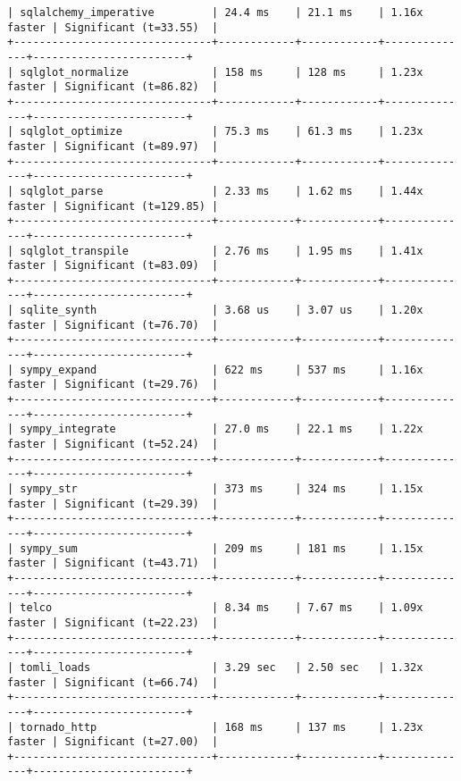 \begin{code}
\begin{verbatim}
| sqlalchemy_imperative         | 24.4 ms    | 21.1 ms    | 1.16x faster | Significant (t=33.55)  |
+-------------------------------+------------+------------+--------------+------------------------+
| sqlglot_normalize             | 158 ms     | 128 ms     | 1.23x faster | Significant (t=86.82)  |
+-------------------------------+------------+------------+--------------+------------------------+
| sqlglot_optimize              | 75.3 ms    | 61.3 ms    | 1.23x faster | Significant (t=89.97)  |
+-------------------------------+------------+------------+--------------+------------------------+
| sqlglot_parse                 | 2.33 ms    | 1.62 ms    | 1.44x faster | Significant (t=129.85) |
+-------------------------------+------------+------------+--------------+------------------------+
| sqlglot_transpile             | 2.76 ms    | 1.95 ms    | 1.41x faster | Significant (t=83.09)  |
+-------------------------------+------------+------------+--------------+------------------------+
| sqlite_synth                  | 3.68 us    | 3.07 us    | 1.20x faster | Significant (t=76.70)  |
+-------------------------------+------------+------------+--------------+------------------------+
| sympy_expand                  | 622 ms     | 537 ms     | 1.16x faster | Significant (t=29.76)  |
+-------------------------------+------------+------------+--------------+------------------------+
| sympy_integrate               | 27.0 ms    | 22.1 ms    | 1.22x faster | Significant (t=52.24)  |
+-------------------------------+------------+------------+--------------+------------------------+
| sympy_str                     | 373 ms     | 324 ms     | 1.15x faster | Significant (t=29.39)  |
+-------------------------------+------------+------------+--------------+------------------------+
| sympy_sum                     | 209 ms     | 181 ms     | 1.15x faster | Significant (t=43.71)  |
+-------------------------------+------------+------------+--------------+------------------------+
| telco                         | 8.34 ms    | 7.67 ms    | 1.09x faster | Significant (t=22.23)  |
+-------------------------------+------------+------------+--------------+------------------------+
| tomli_loads                   | 3.29 sec   | 2.50 sec   | 1.32x faster | Significant (t=66.74)  |
+-------------------------------+------------+------------+--------------+------------------------+
| tornado_http                  | 168 ms     | 137 ms     | 1.23x faster | Significant (t=27.00)  |
+-------------------------------+------------+------------+--------------+------------------------+

\end{verbatim}
\end{code}
